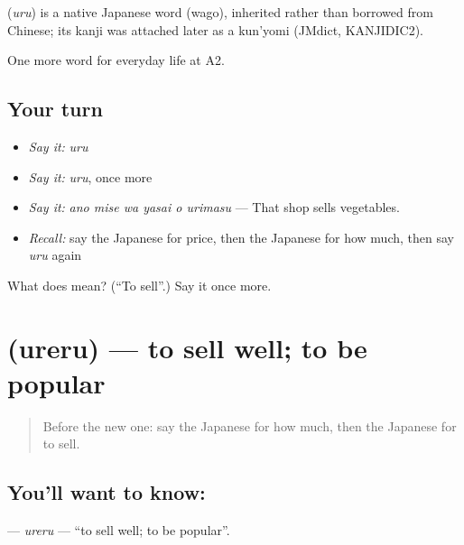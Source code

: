 \begin{cousinweb}
\textbf{} (\emph{uru}) is a native Japanese word (wago), inherited rather than borrowed from Chinese; its kanji was attached later as a kun'yomi (JMdict, KANJIDIC2).
\end{cousinweb}

\begin{grammarlens}[title={What you've built}]
One more word for everyday life at A2.
\end{grammarlens}

\subsection*{Your turn}
\begin{itemize}
\raggedright
  \item \emph{Say it:} \emph{uru}
  \item \emph{Say it:} \emph{uru}, once more
  \item \emph{Say it:} \emph{ano mise wa yasai o urimasu} — That shop sells vegetables.
  \item \emph{Recall:} say the Japanese for price, then the Japanese for how much, then say \emph{uru} again
\end{itemize}

\begin{tcolorbox}[breakable,colback=teal!4,colframe=teal!35!black,title={Before you move on}]
What does  mean? (\textquotedblleft{}To sell\textquotedblright{}.) Say it once more.
\end{tcolorbox}
\section[\texorpdfstring{\ja{うれる} (ureru)}{うれる (ureru)}]{ (ureru) — to sell well; to be popular}

\label{lesson:JA-C181-ureru}



\begin{quote}
Before the new one: say the Japanese for how much, then the Japanese for to sell.
\end{quote}

\subsection*{You'll want to know: }
\textbf{} — \emph{ureru} — \textquotedblleft{}to sell well; to be popular\textquotedblright{}.

